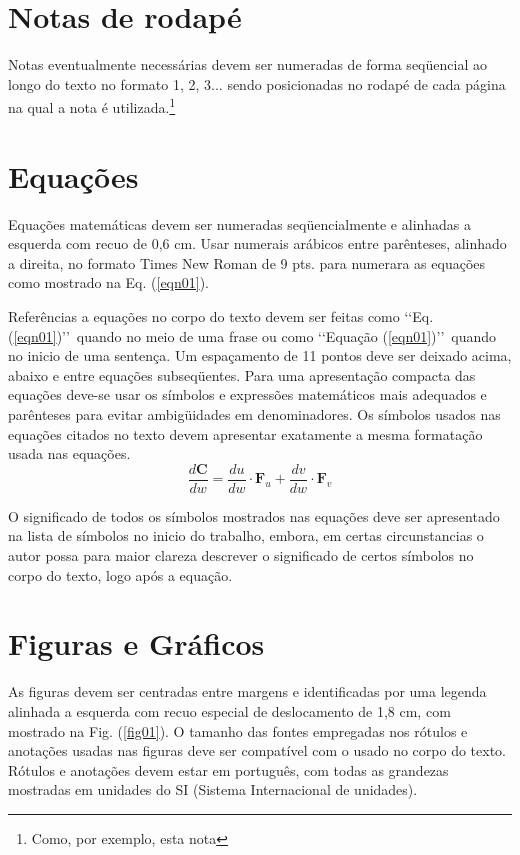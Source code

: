 \section{Notas de rodapé}

Notas eventualmente necessárias devem ser numeradas de forma seqüencial ao
longo do texto no formato 1, 2, 3... sendo posicionadas no rodapé de cada
página na qual a nota é utilizada.\footnote{Como, por exemplo, esta nota}

\section{Equações}

Equações matemáticas devem ser numeradas seqüencialmente e alinhadas a
esquerda com recuo de 0,6 cm. Usar numerais arábicos entre parênteses,
alinhado a direita, no formato Times New Roman de 9 pts. para numerara as
equações como mostrado na Eq. (\ref{eqn01}).

Referências a equações no corpo do texto devem ser feitas como \lq\lq Eq.
(\ref{eqn01})\rq\rq\ quando no meio de uma frase ou como \lq\lq Equação
(\ref{eqn01})\rq\rq\ quando no inicio de uma sentença. Um espaçamento de 11
pontos deve ser deixado acima, abaixo e entre equações subseqüentes. Para uma
apresentação compacta das equações deve-se usar os símbolos e expressões
matemáticos mais adequados e parênteses para evitar ambigüidades em
denominadores. Os símbolos usados nas equações citados no texto devem
apresentar exatamente a mesma formatação usada nas equações.
\begin{equation}
\label{eqn01}
	\frac{d\mathbf{C}}{dw} = \frac{du}{dw}\cdot \mathbf{F}_u +
		\frac{dv}{dw}\cdot \mathbf{F}_v
\end{equation}

O significado de todos os símbolos mostrados nas equações deve ser apresentado
na lista de símbolos no inicio do trabalho, embora, em certas circunstancias o
autor possa para maior clareza descrever o significado de certos símbolos no
corpo do texto, logo após a equação.

\section{Figuras e Gráficos}

As figuras devem ser centradas entre margens e identificadas por uma legenda
alinhada a esquerda com recuo especial de deslocamento de 1,8 cm, com mostrado
na Fig. (\ref{fig01}). O tamanho das fontes empregadas nos rótulos e anotações
usadas nas figuras deve ser compatível com o usado no corpo do texto. Rótulos e
anotações devem estar em português, com todas as grandezas mostradas em
unidades do SI (Sistema Internacional de unidades).

